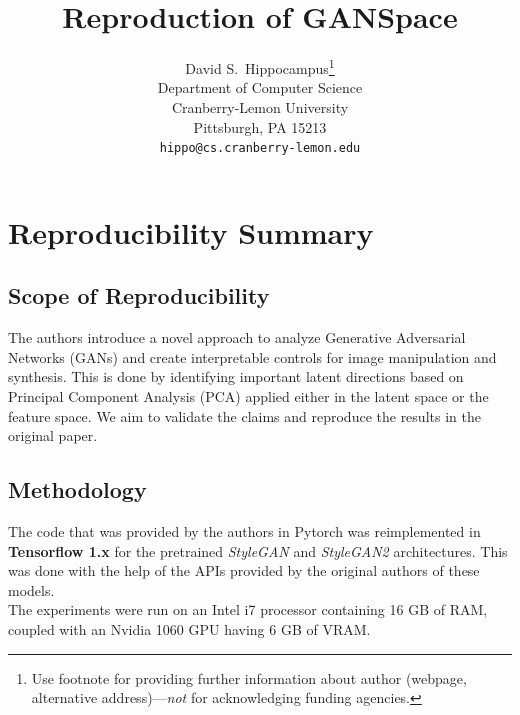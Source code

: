 \documentclass{article}
\title{Reproduction of GANSpace}
\author{%
  David S.~Hippocampus\thanks{Use footnote for providing further information
    about author (webpage, alternative address)---\emph{not} for acknowledging
    funding agencies.} \\
  Department of Computer Science\\
  Cranberry-Lemon University\\
  Pittsburgh, PA 15213 \\
  \texttt{hippo@cs.cranberry-lemon.edu} \\
}
\begin{document}
\maketitle

\section*{\centering Reproducibility Summary}


\subsection*{Scope of Reproducibility}

The authors introduce a novel approach to analyze Generative Adversarial Networks (GANs) and create interpretable controls for image manipulation and synthesis. This is done by identifying important latent directions based on Principal Component Analysis (PCA) applied either in the latent space or the feature space. We aim to validate the claims and reproduce the results in the original paper.

\subsection*{Methodology}

The code that was provided by the authors in Pytorch was reimplemented in \textbf{Tensorflow 1.x} for the pretrained \textit{StyleGAN} and \textit{StyleGAN2} architectures. This was done with the help of the APIs provided by the original authors of these models.
\\
The experiments were run on an Intel i7 processor containing 16 GB of RAM, coupled with an Nvidia 1060 GPU having 6 GB of VRAM.
\end{document}
